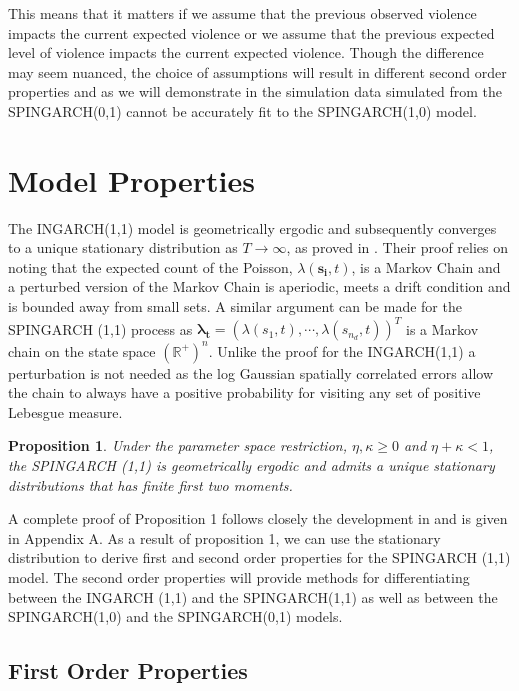 \documentclass[11pt]{isuthesis}
\newtheorem{prop}{Proposition}
\begin{document}
This means that it matters if we assume that the previous observed violence impacts the current expected violence or we assume that the previous expected level of violence impacts the current expected violence.  Though the difference may seem nuanced, the choice of assumptions will result in different second order properties and as we will demonstrate in the simulation data simulated from the SPINGARCH(0,1) cannot be accurately fit to the SPINGARCH(1,0) model.


\section{Model Properties}

The INGARCH(1,1) model is geometrically ergodic and subsequently converges to a unique stationary distribution as $T \to \infty$, as proved in \cite{fokianos2009poisson}.  Their proof relies on noting that the expected count of the Poisson, $\lambda(\boldsymbol{s_i},t)$, is a Markov Chain and a perturbed version of the Markov Chain is aperiodic, meets a drift condition and is bounded away from small sets.  A similar argument can be made for the SPINGARCH (1,1) process as $\boldsymbol{\lambda_t}=\left(\lambda(s_1,t),\cdots,\lambda(s_{n_d},t)\right)^T$ is a Markov chain on the state space $(\mathbb{R}^+)^n$. Unlike the proof for the INGARCH(1,1) a perturbation is not needed as the log Gaussian spatially correlated errors allow the chain to always have a positive probability for visiting any set of positive Lebesgue measure. 

\begin{prop} \label{Prop 1}
	Under the parameter space restriction, $\eta,\kappa\geq0$ and $\eta+\kappa<1$, the SPINGARCH (1,1) is geometrically ergodic and admits a unique stationary distributions that has finite first two moments.
\end{prop}
A complete proof of Proposition 1 follows closely the development in \cite{fokianos2009poisson} and is given in Appendix A.  As a result of proposition 1, we can use the stationary distribution to derive first and second order properties for the SPINGARCH (1,1) model.  The second order properties will provide methods for differentiating between the INGARCH (1,1) and the SPINGARCH(1,1) as well as between the SPINGARCH(1,0) and the SPINGARCH(0,1) models. 

\subsection{First Order Properties}
\end{document}
